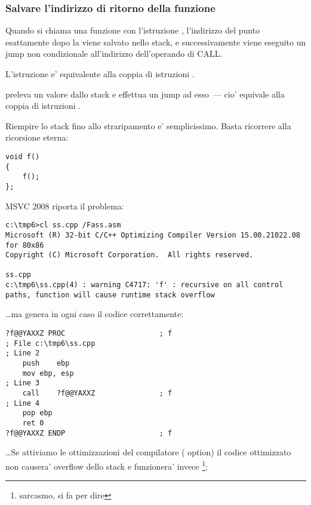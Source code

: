 \subsubsection{Salvare l'indirizzo di ritorno della funzione}


Quando si chiama una funzione con l'istruzione \CALL, l'indirizzo del punto esattamente dopo la \CALL viene salvato nello stack, e successivamente
viene eseguito un jump non condizionale all'indirizzo dell'operando di CALL.

L'istruzione \CALL e' equivalente alla coppia di istruzioni .

\RET preleva un valore dallo stack e effettua un jump ad esso~--- cio' equivale alla coppia di istruzioni .

\myindex{\Recursion}

Riempire lo stack fino allo straripamento e' semplicissimo. Basta ricorrere alla ricorsione eterna:

\begin{lstlisting}
void f()
{
	f();
};
\end{lstlisting}

MSVC 2008 riporta il problema:

\begin{lstlisting}
c:\tmp6>cl ss.cpp /Fass.asm
Microsoft (R) 32-bit C/C++ Optimizing Compiler Version 15.00.21022.08 for 80x86
Copyright (C) Microsoft Corporation.  All rights reserved.

ss.cpp
c:\tmp6\ss.cpp(4) : warning C4717: 'f' : recursive on all control paths, function will cause runtime stack overflow
\end{lstlisting}

\dots ma genera in ogni caso il codice correttamente:

\begin{lstlisting}
?f@@YAXXZ PROC						; f
; File c:\tmp6\ss.cpp
; Line 2
	push	ebp
	mov	ebp, esp
; Line 3
	call	?f@@YAXXZ				; f
; Line 4
	pop	ebp
	ret	0
?f@@YAXXZ ENDP						; f
\end{lstlisting}

\dots Se attiviamo le ottimizzazioni del compilatore (\TT{\Ox} option) il codice ottimizzato non causera' overflow dello stack 
e funzionera' invece \footnote{sarcasmo, si fa per dire}:

